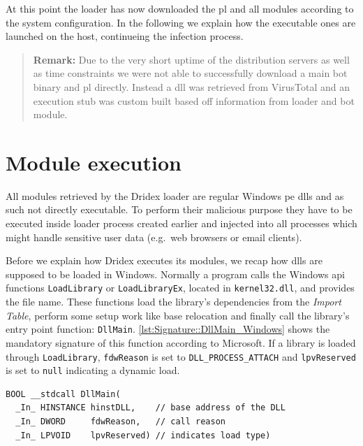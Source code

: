 At this point the loader has now downloaded the \gls{pl} and all modules according to the system configuration.
In the following we explain how the executable ones are launched on the host, continueing the infection process.

\begin{quote}
\textbf{Remark:}
Due to the very short uptime of the distribution servers as well as time constraints we were not able to successfully download a main bot binary and \gls{pl} directly.
Instead a \gls{dll} was retrieved from VirusTotal and an execution stub was custom built based off information from loader and bot module.
\end{quote}


\section{Module execution\label{sec:Reverse_engineering_Dridex::Module_execution}}
All modules retrieved by the Dridex loader are regular Windows \gls{pe} \glspl{dll} and as such not directly executable.
To perform their malicious purpose they have to be executed inside loader process created earlier and injected into all processes which might handle sensitive user data (e.g.\ web browsers or email clients).

Before we explain how Dridex executes its modules, we recap how \glspl{dll} are supposed to be loaded in Windows.
Normally a program calls the Windows \gls{api} functions \lstinline|LoadLibrary| or \lstinline|LoadLibraryEx|, located in \lstinline|kernel32.dll|, and provides the file name.
These functions load the library's dependencies from the \emph{Import Table}, perform some setup work like base relocation and finally call the library's entry point function: \lstinline|DllMain|.
\autoref{lst:Signature::DllMain_Windows} shows the mandatory signature of this function according to Microsoft.
If a library is loaded through \lstinline|LoadLibrary|, \lstinline|fdwReason| is set to \lstinline|DLL_PROCESS_ATTACH| and \lstinline|lpvReserved| is set to \lstinline|null| indicating a dynamic load.

\begin{lstlisting}[style=win, caption={Signature of \texttt{DllMain} according to Microsoft}, label={lst:Signature::DllMain_Windows}]
BOOL __stdcall DllMain(
  _In_ HINSTANCE hinstDLL,    // base address of the DLL
  _In_ DWORD     fdwReason,   // call reason
  _In_ LPVOID    lpvReserved) // indicates load type)
\end{lstlisting}

